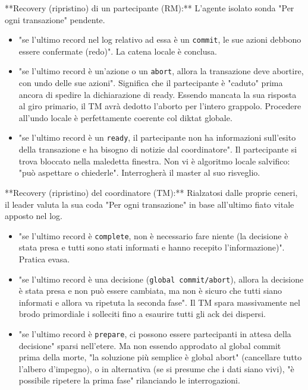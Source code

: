 **Recovery (ripristino) di un partecipante (RM):**
L'agente isolato sonda "Per ogni transazione" pendente.
\begin{itemize}
    \item "se l'ultimo record nel log relativo ad essa è un \texttt{commit}, le sue azioni debbono essere confermate (redo)". La catena locale è conclusa.
    \item "se l'ultimo record è un'azione o un \texttt{abort}, allora la transazione deve abortire, con undo delle sue azioni". Significa che il partecipante è "caduto" prima ancora di spedire la dichiarazione di ready. Essendo mancata la sua risposta al giro primario, il TM avrà dedotto l'aborto per l'intero grappolo. Procedere all'undo locale è perfettamente coerente col diktat globale.
    \item "se l'ultimo record è un \texttt{ready}, il partecipante non ha informazioni sull'esito della transazione e ha bisogno di notizie dal coordinatore". Il partecipante si trova bloccato nella maledetta finestra. Non vi è algoritmo locale salvifico: "può aspettare o chiederle". Interrogherà il master al suo risveglio.
\end{itemize}

**Recovery (ripristino) del coordinatore (TM):**
Rialzatosi dalle proprie ceneri, il leader valuta la sua coda "Per ogni transazione" in base all'ultimo fiato vitale apposto nel log.
\begin{itemize}
    \item "se l'ultimo record è \texttt{complete}, non è necessario fare niente (la decisione è stata presa e tutti sono stati informati e hanno recepito l'informazione)". Pratica evasa.
    \item "se l'ultimo record è una decisione (\texttt{global commit/abort}), allora la decisione è stata presa e non può essere cambiata, ma non è sicuro che tutti siano informati e allora va ripetuta la seconda fase". Il TM spara massivamente nel brodo primordiale i solleciti fino a esaurire tutti gli ack dei dispersi.
    \item "se l'ultimo record è \texttt{prepare}, ci possono essere partecipanti in attesa della decisione" sparsi nell'etere. Ma non essendo approdato al global commit prima della morte, "la soluzione più semplice è global abort" (cancellare tutto l'albero d'impegno), o in alternativa (se si presume che i dati siano vivi), "è possibile ripetere la prima fase" rilanciando le interrogazioni.
\end{itemize}
